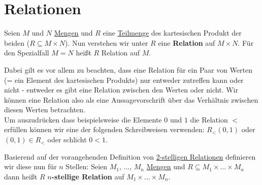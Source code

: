 \documentclass[../../main.tex]{subfiles}
\begin{document}
	
	\chapter{Relationen}
	
	\begin{definition}
		\label{def:Relation}
		Seien $M$ und $N$ \hyperref[def:Menge]{Mengen} und $R$ eine \hyperref[def:Teilmenge]{Teilmenge} des kartesischen Produkt der beiden ($R \subseteq M \times N$). Nun verstehen wir unter $R$ eine \textbf{Relation} auf $M \times N$. Für den Spezialfall $M=N$ heißt $R$ Relation auf $M$.
	\end{definition}

	Dabei gilt es vor allem zu beachten, dass eine Relation für ein Paar von Werten (= ein Element des kartesischen Produkts) nur entweder zutreffen kann oder nicht - entweder es gibt eine Relation zwischen den Werten oder nicht. Wir können eine Relation also als eine Aussagevorschrift über das Verhältnis zwischen diesen Werten betrachten.\\
	
	
	Um auszudrücken dass beispielsweise die Elemente $0$ und $1$ die Relation $<$ erfüllen können wir eine der folgenden Schreibweisen verwenden: $R_<(0,1)$ oder $(0,1) \in R_<$ oder schlicht $0<1$.
	
	\begin{definition}
		\label{def:nStelligeRelation}
		Basierend auf der vorangehenden Definition von \hyperref[def:Relation]{2-stelligen Relationen} definieren wir diese nun für $n$ Stellen: Seien $M_1$, ..., $M_n$ \hyperref[def:Menge]{Mengen} und $R \subseteq M_1 \times ... \times M_n$ dann heißt $R$ \textbf{$n$-stellige Relation} auf $M_1 \times ... \times M_n$.
	\end{definition}
\end{document}
